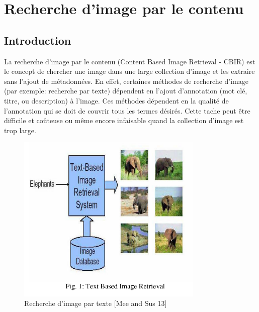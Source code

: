 
\chapter{Recherche d'image par le contenu} %




\section{Introduction}

La recherche d'image par le contenu (Content Based Image Retrieval - CBIR) est le concept de chercher une image dans une large collection d'image et les extraire sans l'ajout de métadonnées. En effet, certaines méthodes de recherche d'image (par exemple: recherche par texte) dépendent en l'ajout d'annotation (mot clé, titre, ou description) à l'image. Ces méthodes dépendent en la qualité de l'annotation qui se doit  de couvrir tous les termes désirés. Cette tache peut être difficile et coûteuse ou même encore infaisable quand la collection d'image est trop large.

\begin{figure}[htbp]
	\centering
		\includegraphics[width=3.5in]{Figures/textBasedIR.png}
	\caption[An Electron]{Recherche d'image par texte [Mee and Sus 13]}
	\label{fig:Electron}
\end{figure}

